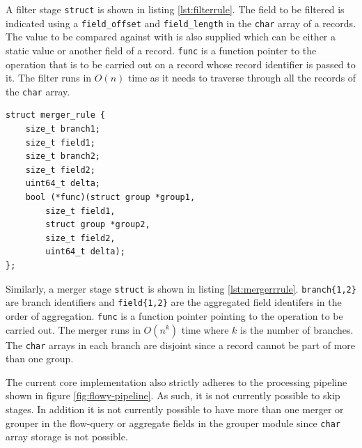 A filter stage \texttt{struct} is shown in listing \ref{lst:filterrule}. The field to be filtered is indicated using a \texttt{field\_offset} and \texttt{field\_length} in the \texttt{char} array of a records. The value to be compared against with is also supplied which can be either a static value or another field of a record. \texttt{func} is a function pointer to the operation that is to be carried out on a record whose record identifier is passed to it. The filter runs in $O(n)$ time as it needs to traverse through all the records of the \texttt{char} array.

\begin{lstlisting}
struct merger_rule {
	size_t branch1;
	size_t field1;
	size_t branch2;
	size_t field2;
	uint64_t delta;
	bool (*func)(struct group *group1,
		size_t field1,
		struct group *group2,
		size_t field2,
		uint64_t delta);
};
\end{lstlisting}

Similarly, a merger stage \texttt{struct} is shown in listing \ref{lst:mergerrrule}. \texttt{branch\{1,2\}} are branch identifiers and \texttt{field\{1,2\}} are the aggregated field identifers in the order of aggregation. \texttt{func} is a function pointer pointing to the operation to be carried out. The merger runs in $O(n^k)$ time where $k$ is the number of branches. The \texttt{char} arrays in each branch are disjoint since a record cannot be part of more than one group.

The current core implementation also strictly adheres to the processing pipeline shown in figure \ref{fig:flowy-pipeline}. As such, it is not currently possible to skip stages. In addition it is not currently possible to have more than one merger or grouper in the flow-query or aggregate fields in the grouper module since \texttt{char} array storage is not possible. 

